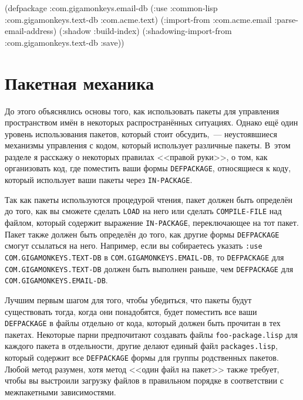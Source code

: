 \begin{myverb}
(defpackage :com.gigamonkeys.email-db
  (:use
   :common-lisp
   :com.gigamonkeys.text-db
   :com.acme.text)
  (:import-from :com.acme.email :parse-email-address)
  (:shadow :build-index)
  (:shadowing-import-from :com.gigamonkeys.text-db :save))
\end{myverb}

\section{Пакетная механика}

До этого объяснялись основы того, как использовать пакеты для управления пространством
имён в некоторых распространённых ситуациях. Однако ещё один уровень использования
пакетов, который стоит обсудить,~--- неустоявшиеся механизмы управления с кодом, который
использует различные пакеты. В~этом разделе я расскажу о некоторых правилах <<правой
руки>>, о том, как организовать код, где поместить ваши формы \lstinline{DEFPACKAGE},
относящиеся к коду, который использует ваши пакеты через \lstinline{IN-PACKAGE}.

Так как пакеты используются процедурой чтения, пакет должен быть определён до того, как вы
сможете сделать \lstinline{LOAD} на него или сделать \lstinline{COMPILE-FILE} над файлом, который
содержит выражение \lstinline{IN-PACKAGE}, переключающее на тот пакет. Пакет также должен быть
определён до того, как другие формы \lstinline{DEFPACKAGE} смогут ссылаться на него. Например,
если вы собираетесь указать \lstinline{:use COM.GIGAMONKEYS.TEXT-DB} в
\lstinline{COM.GIGAMONKEYS.EMAIL-DB}, то \lstinline{DEFPACKAGE} для \lstinline{COM.GIGAMONKEYS.TEXT-DB}
должен быть выполнен раньше, чем \lstinline{DEFPACKAGE} для \lstinline{COM.GIGAMONKEYS.EMAIL-DB}.

Лучшим первым шагом для того, чтобы убедиться, что пакеты будут существовать тогда, когда
они понадобятся, будет поместить все ваши \lstinline{DEFPACKAGE} в файлы отдельно от кода,
который должен быть прочитан в тех пакетах. Некоторые парни предпочитают создавать файлы
\lstinline{foo-package.lisp} для каждого пакета в отдельности, другие делают единый файл
\lstinline{packages.lisp}, который содержит все \lstinline{DEFPACKAGE} формы для группы родственных
пакетов. Любой метод разумен, хотя метод <<один файл на пакет>> также требует, чтобы вы
выстроили загрузку файлов в правильном порядке в соответствии с межпакетными
зависимостями.

